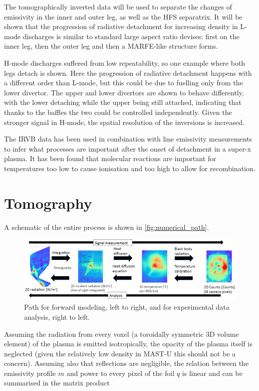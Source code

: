 The tomographically inverted data will be used to separate the changes of emissivity in the inner and outer leg, as well as the HFS separatrix. It will be shown that the progression of radiative detachment for increasing density in L-mode discharges is similar to standard large aspect ratio devises: first on the inner leg, then the outer leg and then a MARFE-like structure forms.

H-mode discharges suffered from low repeatability, so one example where both legs detach is shown. Here the progression of radiative detachment happens with a different order than L-mode, but this could be due to fuelling only from the lower divertor. The upper and lower divertors are shown to behave differently, with the lower detaching while the upper being still attached, indicating that thanks to the baffles the two could be controlled independently. Given the stronger signal in H-mode, the spatial resolution of the inversions is increased.

The IRVB data has been used in combination with line emissivity measurements to infer what processes are important after the onset of detachment in a super-x plasma. It has been found that molecular reactions are important for temperatures too low to cause ionisation and too high to allow for recombination.

\section{Tomography}\label{Tomography}
A schematic of the entire process is shown in \autoref{fig:numerical_path}.

\begin{figure}[!ht]
	\centering
	\includegraphics[width=\linewidth]{Chapters/chapter2/figs/numerical_path.png}
	\caption{Path for forward modeling, left to right, and for experimental data analysis, right to left.}
	\label{fig:numerical_path}
\end{figure}

Assuming the radiation from every voxel (a toroidally symmetric 3D volume element) of the plasma is emitted isotropically, the opacity of the plasma itself is neglected (given the relatively low density in MAST-U this should not be a concern\cite{Verhaegh2021a,Terry1998,Soukhanovskii2022}).  Assuming also that reflections are negligible, the relation between the emissivity profile $m$ and power to every pixel of the foil $q$ is linear and can be summarised in the matrix product

